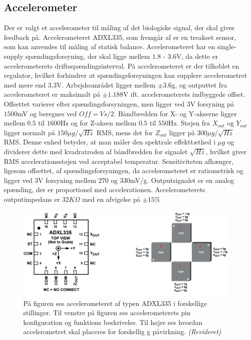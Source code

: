 \subsection{Accelerometer}\label{Subsec:AccTeori}
Der er valgt et accelerometer til måling af det biologiske signal, der skal gives feedback på. Accelerometeret ADXL335, som fremgår af  er en treakset sensor, som kan anvendes til måling af statisk balance. Accelerometeret har en single-supply spændingsforsyning, der skal ligge mellem $1.8$ - $3.6$V, da dette er accelerometerets driftsspændingsinterval. På accelerometeret er der tilkoblet en regulator, hvilket forhindrer at spændingsforsyningen kan supplere accelerometret med mere end $3.3$V.  Arbejdsområdet ligger mellem $\pm3.6$g, og outputtet fra accelerometeret er maksimalt på $\pm1.188$V ift. accelerometerets indbyggede offset. Offsettet varierer efter spændingsforsyningen, men ligger ved $3$V forsyning på $1500$mV og beregnes ved $Off = Vs/2$. Båndbredden for X- og Y-akserne ligger mellem $0.5$ til $1600$Hz og for Z-aksen mellem $0.5$ til $550$Hz. Støjen fra $X_{out}$ og $Y_{out}$ ligger normalt på $150\mu g/\sqrt{Hz}$ RMS, mens det for $Z_{out}$ ligger på $300\mu g/\sqrt{Hz}$ RMS. Denne enhed betyder, at man måler den spektrale effekttæthed i $\mu g$ og dividerer dette med kvadratroden af båndbredden for signalet $\sqrt{Hz}$, hvilket giver RMS accelerationsstøjen ved acceptabel temperatur. Sensitiviteten afhænger, ligesom offsettet, af spændingsforsyningen, da accelerometeret er ratiometrisk og ligger ved $3$V forsyning mellem $270$ og $330$mV/g. Outputsignalet er en analog spænding, der er proportionel med accelerationen. Accelerometerets outputimpedans er $32K\Omega$ med en afvigelse på $\pm15\%$ \cite{Devices2009} %

\begin{figure}[H]
	\centering 
	\includegraphics[scale=0.5]{figures/cProblemloesning/ADXL335_2.JPG}
	\caption{På figuren ses accelerometeret af typen ADXL335 i forskellige stillinger. Til venstre på figuren ses accelerometerets pin konfiguration og funktions beskrivelse. Til højre ses hvordan accelerometret skal placeres for forskellig g påvirkning. \textit{(Revideret)} \cite{Devices2009}}
	\label{ADXL335}
\end{figure}

